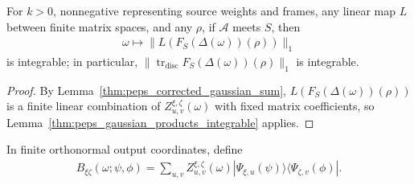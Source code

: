 \begin{lemma}
    \label{thm:peps_actual_physical_integrability}
    \leanok
    For $k>0$, nonnegative representing source weights and frames, any linear map
    $L$ between finite matrix spaces, and any $\rho$, if $\mathcal A$ meets $S$,
    then
    \begin{align}
        \omega\longmapsto\|L(F_S(\Delta(\omega))(\rho))\|_1
        \label{eq:peps_actual_physical_integrability}
    \end{align}
    is integrable; in particular,
    $\|\operatorname{tr}_{\mathrm{disc}}F_S(\Delta(\omega))(\rho)\|_1$ is
    integrable.
\end{lemma}

\begin{proof}\leanok
    By Lemma~\ref{thm:peps_corrected_gaussian_sum},
    $L(F_S(\Delta(\omega))(\rho))$ is a finite linear combination of
    $Z^{\xi,\zeta}_{u,v}(\omega)$ with fixed matrix coefficients, so
    Lemma~\ref{thm:peps_gaussian_products_integrable} applies.
\end{proof}

\begin{definition}
    \label{def:peps_gaussian_branch_density}
    \leanok
    In finite orthonormal output coordinates, define
    \begin{align}
        B_{\xi\zeta}(\omega;\psi,\phi)
        =\sum_{u,v}Z^{\xi,\zeta}_{u,v}(\omega)
        |\Psi_{\xi,u}(\psi)\rangle\langle\Psi_{\zeta,v}(\phi)|.
        \label{eq:peps_gaussian_branch_density}
    \end{align}
\end{definition}

